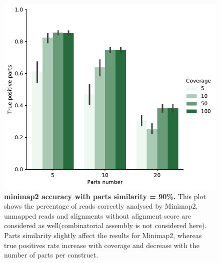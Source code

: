 \documentclass[11pt, a4paper]{article}
\begin{document}
\begin{figure}[ht]
    \begin{center}
    \includegraphics[width=1\textwidth]{../results/images_notebook/v_400/minimap_sim_90_true_positive.pdf}
    \end{center}
    \caption{{\bf  minimap2 accuracy with parts similarity = 90\%.} This plot shows the percentage of reads correctly analysed by Minimap2, unmapped reads and alignments without alignment score are considered as well(combinatorial assembly is not considered here). Parts similarity slightly affect the results for Minimap2, whereas true positives rate increase with coverage and decrease with the number of parts per construct.}
   \label{fig:v_400_accuracy_sim_90}
\end{figure}
\end{document}
